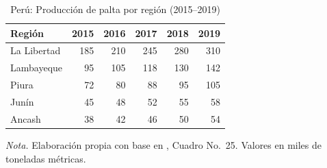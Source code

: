 \begin{table}[H]
\centering
\caption{Per\'u: Producci\'on de palta por regi\'on (2015--2019)}
\label{tab:produccion_region}
\small
\begin{tabular}{lrrrrr}
\toprule
\textbf{Regi\'on} & \textbf{2015} & \textbf{2016} & \textbf{2017} & \textbf{2018} & \textbf{2019} \\
\midrule
La Libertad  & 185 & 210 & 245 & 280 & 310 \\
Lambayeque   &  95 & 105 & 118 & 130 & 142 \\
Piura        &  72 &  80 &  88 &  95 & 105 \\
Jun\'in       &  45 &  48 &  52 &  55 &  58 \\
Ancash       &  38 &  42 &  46 &  50 &  54 \\
\bottomrule
\end{tabular}
\parbox{0.94\textwidth}{\small \textit{Nota.} Elaboraci\'on propia con base en \citep{SierraSelva2020}, Cuadro No.~25. Valores en miles de toneladas m\'etricas.}
\end{table}
